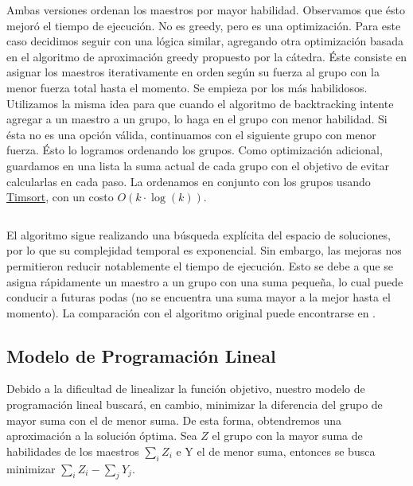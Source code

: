 \documentclass{article}
\begin{document}
Ambas versiones ordenan los maestros por mayor habilidad. Observamos que ésto mejoró el tiempo de ejecución. No es greedy, pero es una optimización. Para este caso decidimos seguir con una lógica similar, agregando otra optimización basada en el algoritmo de aproximación greedy propuesto por la cátedra. Éste consiste en asignar los maestros iterativamente en orden según su fuerza al grupo con la menor fuerza total hasta el momento. Se empieza por los más habilidosos. Utilizamos la misma idea para que cuando el algoritmo de backtracking intente agregar a un maestro a un grupo, lo haga en el grupo con menor habilidad. Si ésta no es una opción válida, continuamos con el siguiente grupo con menor fuerza. Ésto lo logramos ordenando los grupos. Como optimización adicional, guardamos en una lista la suma actual de cada grupo con el objetivo de evitar calcularlas en cada paso. La ordenamos en conjunto con los grupos usando \href{https://svn.python.org/projects/python/trunk/Objects/listsort.txt}{Timsort}, con un costo $O(k \cdot \log(k))$.  

\inputminted[linenos, firstline=29, lastline=64]{python}{codigo/backtracking_con_greedy.py}

El algoritmo sigue realizando una búsqueda explícita del espacio de soluciones, por lo que su complejidad temporal es exponencial. Sin embargo, las mejoras nos permitieron reducir notablemente el tiempo de ejecución. Esto se debe a que se asigna rápidamente un maestro a un grupo con una suma pequeña, lo cual puede conducir a futuras podas (no se encuentra una suma mayor a la mejor hasta el momento). La comparación con el algoritmo original puede encontrarse en . 
\subsection{Modelo de Programación Lineal}

Debido a la dificultad de linealizar la función objetivo, nuestro modelo de programación lineal buscará, en cambio, minimizar la diferencia del grupo de mayor suma con el de menor suma. De esta forma, obtendremos una aproximación a la solución óptima. Sea $Z$ el grupo con la mayor suma de habilidades de los maestros \(\sum_{i} Z_i\) e Y el de menor suma, entonces se busca minimizar \(\sum_{i} Z_i - \sum_{j} Y_j\).
\end{document}
